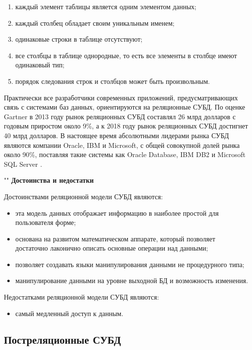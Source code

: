 \documentclass{bmstu}
\begin{document}
\begin{enumerate}
	\item каждый элемент таблицы является одним элементом данных;
	\item каждый столбец обладает своим уникальным именем;
	\item одинаковые строки в таблице отсутствуют;
	\item все столбцы в таблице однородные, то есть все элементы в столбце имеют одинаковый тип;
	\item порядок следования строк и столбцов может быть произвольным.
\end{enumerate}

Практически все разработчики современных приложений, предусматривающих связь с системами баз данных, ориентируются на реляционные СУБД. По оценке Gartner в 2013 году рынок реляционных СУБД составлял 26 млрд долларов с годовым приростом около 9\%, а к 2018 году рынок реляционных СУБД достигнет 40 млрд долларов. В настоящее время абсолютными лидерами рынка СУБД являются компании Oracle, IBM и Microsoft, с общей совокупной долей рынка около 90\%, поставляя такие системы как Oracle Database, IBM DB2 и Microsoft SQL Server \cite{dbms}.

""\newline
\noindent\textbf{Достоинства и недостатки}

Достоинствами реляционной модели СУБД являются:

\begin{itemize}
	\item эта модель данных отображает информацию в наиболее простой для пользователя форме;
	\item основана на развитом математическом аппарате, который позволяет достаточно лаконично описать основные операции над данными;
	\item позволяет создавать языки манипулирования данными не процедурного типа;
	\item манипулирование данными на уровне выходной БД и возможность изменения.
\end{itemize}

Недостатками реляционной модели СУБД являются:

\begin{itemize}
	\item самый медленный доступ к данным.
\end{itemize}

\subsection*{Постреляционные СУБД}
\end{document}

